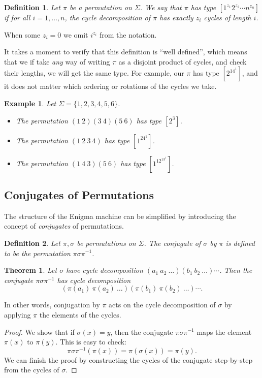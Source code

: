\documentclass[11pt]{article}
\newtheorem{theorem}{Theorem}
\newtheorem{definition}{Definition}
\newtheorem{example}{Example}
\begin{document}
\begin{definition}
    Let $\pi$ be a permutation on $\Sigma$. We say that $\pi$ has \emph{type}
    $[1^{z_1} 2^{z_2}\cdots n^{z_n}]$ if for all $i=1,\ldots,n$, the
    cycle decomposition of $\pi$ has exactly $z_i$ cycles of length $i$.
\end{definition}
When some $z_i=0$ we omit $i^{z_i}$ from the notation.

It takes a moment to verify that this definition is ``well defined'', which
means that we if take \emph{any} way of writing $\pi$ as a disjoint product of
cycles, and check their lengths, we will get the same type. For example, our
$\pi$ has type $[2^14^1]$, and it does not matter which ordering or rotations
of the cycles we take.

\begin{example} Let $\Sigma = \{1,2,3,4,5,6\}$.
    \begin{itemize}
        \item The permutation $(1\ 2)(3\ 4)(5\ 6)$ has type $[2^3]$.
        \item The permutation $(1\ 2\ 3\ 4)$ has type $[1^24^1]$.
        \item The permutation $(1\ 4\ 3)(5\ 6)$ has type $[1^12^13^1]$.
    \end{itemize}
\end{example}

\subsection{Conjugates of Permutations}

The structure of the Enigma machine can be simplified by introducing
the concept of \emph{conjugates} of permutations.

\begin{definition}
    Let $\pi,\sigma$ be permutations on $\Sigma$. The \emph{conjugate of
    $\sigma$ by $\pi$} is defined to be the permutation
    $\pi\sigma\pi^{-1}$.
\end{definition}

\begin{theorem}
    Let $\sigma$ have cycle decomposition $(a_1\ a_2\ \ldots)(b_1\ b_2\
    \ldots)\cdots$. Then the conjugate $\pi\sigma\pi^{-1}$ has cycle
    decomposition
    \[
        (\pi(a_1)\ \pi(a_2)\ \ldots)(\pi(b_1)\ \pi(b_2)\ \ldots)\cdots.
    \]
\end{theorem}
In other words, conjugation by $\pi$ acts on the cycle decomposition of
$\sigma$ by applying $\pi$ the elements of the cycles.
\begin{proof}
    We show that if $\sigma(x) = y$, then the conjugate $\pi\sigma\pi^{-1}$
    maps the element $\pi(x)$ to $\pi(y)$. This is easy to check:
    \[
        \pi\sigma\pi^{-1}(\pi(x))= \pi(\sigma(x)) = \pi(y).
    \]
    We can finish the proof by
    constructing the cycles of the conjugate step-by-step from the cycles
    of $\sigma$.
\end{proof}
\end{document}
